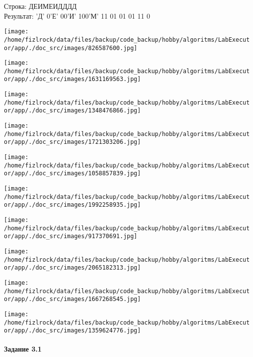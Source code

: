 \documentclass[a4paper, 12pt]{article}
\begin{document}
Строка: 
ДЕИМЕИДДДД\\
Результат: 'Д' 0'Е' 00'И' 100'М' 11 01 01 01 11 0

\texttt{[image: /home/fizlrock/data/files/backup/code\_backup/hobby/algoritms/LabExecutor/app/./doc\_src/images/826587600.jpg]}

\texttt{[image: /home/fizlrock/data/files/backup/code\_backup/hobby/algoritms/LabExecutor/app/./doc\_src/images/1631169563.jpg]}

\texttt{[image: /home/fizlrock/data/files/backup/code\_backup/hobby/algoritms/LabExecutor/app/./doc\_src/images/1348476866.jpg]}

\texttt{[image: /home/fizlrock/data/files/backup/code\_backup/hobby/algoritms/LabExecutor/app/./doc\_src/images/1721303206.jpg]}

\texttt{[image: /home/fizlrock/data/files/backup/code\_backup/hobby/algoritms/LabExecutor/app/./doc\_src/images/1058857839.jpg]}

\texttt{[image: /home/fizlrock/data/files/backup/code\_backup/hobby/algoritms/LabExecutor/app/./doc\_src/images/1992258935.jpg]}

\texttt{[image: /home/fizlrock/data/files/backup/code\_backup/hobby/algoritms/LabExecutor/app/./doc\_src/images/917370691.jpg]}

\texttt{[image: /home/fizlrock/data/files/backup/code\_backup/hobby/algoritms/LabExecutor/app/./doc\_src/images/2065182313.jpg]}

\texttt{[image: /home/fizlrock/data/files/backup/code\_backup/hobby/algoritms/LabExecutor/app/./doc\_src/images/1667268545.jpg]}

\texttt{[image: /home/fizlrock/data/files/backup/code\_backup/hobby/algoritms/LabExecutor/app/./doc\_src/images/1359624776.jpg]}
\pagebreak
\paragraph{Задание 3.1}
\end{document}
